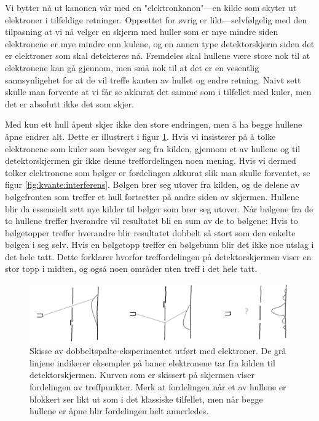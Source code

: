 Vi bytter nå ut kanonen vår med en "elektronkanon"---en kilde som skyter ut elektroner i tilfeldige retninger. Oppsettet for øvrig er likt---selvfølgelig med den tilpasning at vi nå velger en skjerm med huller som er mye mindre siden elektronene er mye mindre enn kulene, og en annen type detektorskjerm siden det er elektroner som skal detekteres nå. Fremdeles skal hullene være store nok til at elektronene kan gå gjennom, men små nok til at det er en vesentlig sannsynligehet for at de vil treffe kanten av hullet og endre retning. Naivt sett skulle man forvente at vi får se akkurat det samme som i tilfellet med kuler, men det er absolutt ikke det som skjer.

Med kun ett hull åpent skjer ikke den store endringen, men å ha begge hullene åpne endrer alt. Dette er illustrert i figur \ref{fig:kvante:kvantetreff}. Hvis vi insisterer på å tolke elektronene som kuler som beveger seg fra kilden, gjennom et av hullene og til detektorskjermen gir ikke denne treffordelingen noen mening. Hvis vi dermed tolker elektronene som bølger er fordelingen akkurat slik man skulle forventet, se figur \ref{fig:kvante:interferens}. Bølgen brer seg utover fra kilden, og de delene av bølgefronten som treffer et hull fortsetter på andre siden av skjermen. Hullene blir da essensielt sett nye kilder til bølger som brer seg utover. Når bølgene fra de to hullene treffer hverandre vil resultatet bli en sum av de to bølgene: Hvis to bølgetopper treffer hverandre blir resultatet dobbelt så stort som den enkelte bølgen i seg selv. Hvis en bølgetopp treffer en bølgebunn blir det ikke noe utslag i det hele tatt. Dette forklarer hvorfor treffordelingen på detektorskjermen viser en stor topp i midten, og også noen områder uten treff i det hele tatt.

\begin{figure}[tp]
	\includegraphics[width=\textwidth]{./dobbeltspalte2}
	\caption{Skisse av dobbeltspalte-eksperimentet utført med elektroner. De grå linjene indikerer eksempler på baner elektronene tar fra kilden til detektorskjermen. Kurven som er skissert på skjermen viser fordelingen av treffpunkter. Merk at fordelingen når et av hullene er blokkert ser likt ut som i det klassiske tilfellet, men når begge hullene er åpne blir fordelingen helt annerledes.}
	\label{fig:kvante:kvantetreff}
\end{figure}

